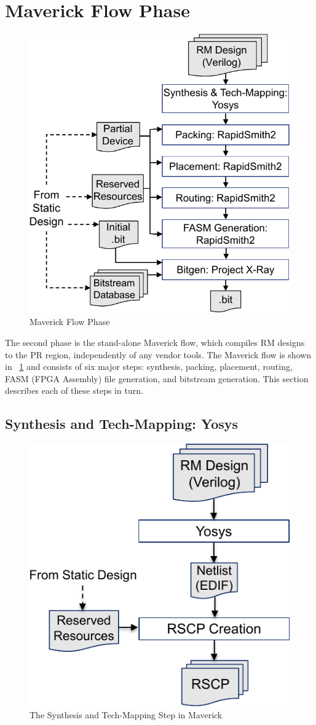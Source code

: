 \section{Maverick Flow Phase}
\label{sec:flow}

\begin{figure}[tb]
	\centering
	\includegraphics[height=.8\columnwidth]{figures/maverick_flow.pdf}
	\caption{Maverick Flow Phase}
	\label{fig:maverick_flow}
\end{figure}

The second phase is the stand-alone Maverick flow, which compiles RM designs to the PR region, independently of any vendor tools.
The Maverick flow is shown in \figurename~\ref{fig:maverick_flow} and consists of six major steps: synthesis, packing, placement, routing, FASM (FPGA Assembly) file generation, and bitstream generation.
This section describes each of these steps in turn.

\subsection{Synthesis and Tech-Mapping: Yosys}

\begin{figure}[tb]
	\centering
	\includegraphics[width=0.58\columnwidth]{figures/synthesis}
	\caption{The Synthesis and Tech-Mapping Step in Maverick}
	\label{fig:synthesis}
\end{figure}

